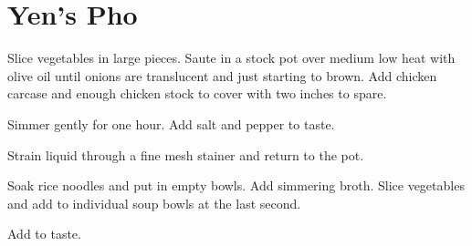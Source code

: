 \section{Yen's Pho}
\begin{recipe}


Slice vegetables in large pieces. Saute in a stock pot over medium low heat with olive oil until onions are translucent and just starting to brown. Add chicken carcase and enough chicken stock to cover with two inches to spare.

Simmer gently for one hour. Add salt and pepper to taste.

Strain liquid through a fine mesh stainer and return to the pot.


Soak rice noodles and put in empty bowls. Add simmering broth. Slice vegetables and add to individual soup bowls at the last second.


Add to taste.


\end{recipe}
